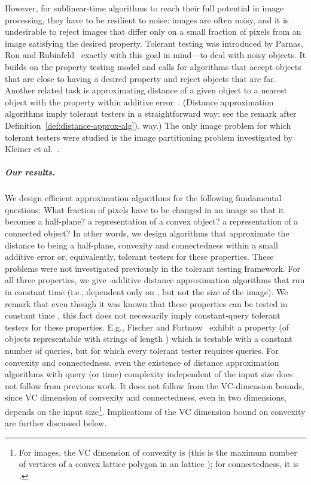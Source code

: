\documentclass[11pt,english]{article}
\numberwithin{figure}{section}
\begin{document}
However, for sublinear-time algorithms to reach their full potential in image processing, they have to be resilient to noise: images are often noisy, and it is undesirable to reject images that differ only on a small fraction of pixels from an image satisfying the desired property. Tolerant testing was introduced by Parnas, Ron and Rubinfeld~\cite{PRR06}  exactly with this goal in mind---to deal with noisy objects. It builds on the property testing model and calls for algorithms that accept objects that are close to having a desired property and reject objects that are far. Another related task is approximating distance of a given object to a nearest object with the property within additive error~. (Distance approximation algorithms imply tolerant testers in a straightforward
\ifnum{}
way: see the remark after Definition~\ref{def:distance-approx-alg}).
\else
way.)
\fi
The only image problem for which tolerant testers were studied is the image partitioning problem investigated by Kleiner et al.~\cite{KleinerKNB11}.
\subparagraph{Our results.}
We design efficient approximation algorithms for the following fundamental questions: What fraction of pixels have to be changed in an image so that it becomes a half-plane? a representation of a convex object? a representation of a connected object?
In other words, we design algorithms that approximate the distance to being a half-plane, convexity and connectedness within a small additive error or, equivalently, tolerant testers for these properties. These problems were not investigated previously in the tolerant testing framework.
For all three properties, we give -additive distance approximation algorithms that run in constant time (i.e., dependent only on , but not the size of the image). We remark that even though it was known that these properties can be tested in constant time \cite{Ras03}, this fact does not necessarily imply constant-query tolerant testers for these properties. E.g., Fischer and Fortnow~\cite{FischerF06} exhibit a property (of objects representable with strings of length ) which is testable with a constant number of queries, but for which every tolerant tester requires  queries.
For convexity and connectedness, even the existence of distance approximation algorithms with query (or time) complexity independent of the input size does not follow from previous work. It does not follow from the VC-dimension bounds, since VC dimension of convexity and connectedness, even in two dimensions, depends on the input size\footnote{For  images, the VC dimension of convexity is  (this is the maximum number of vertices of a convex lattice polygon in an  lattice \cite{Barany00}); for connectedness, it is .}. Implications of the VC dimension bound on convexity are further discussed below.
\end{document}
